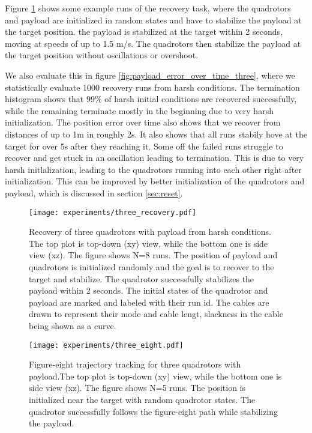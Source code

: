 Figure \ref{fig:three_recovery} shows some example runs of the recovery task, where the quadrotors and payload are initialized in random states and have to stabilize the payload at the target position. the payload is stabilized at the target within 2 seconds, moving at speeds of up to 1.5 m/s. The quadrotors then stabilize the payload at the target position without oscillations or overshoot.

We also evaluate this in figure \ref{fig:payload_error_over_time_three}, where we statistically evaluate 1000 recovery runs from harsh conditions. The termination histogram shows that 99\% of harsh initial conditions are recovered successfully, while the remaining terminate mostly in the beginning due to very harsh initialization. The position error over time also shows that we recover from distances of up to 1m in roughly 2s. It also shows that all runs stabily hove at the target for over 5s after they reaching it. Some off the failed runs struggle to recover and get stuck in an oscillation leading to termination. This is due to very harsh initlalization, leading to the quadrotors running into each other right after initialization. This can be improved by better initialization of the quadrotors and payload, which is discussed in section \ref{sec:reset}.

\begin{figure}[ht]
    \centering
    
    \texttt{[image: experiments/three\_recovery.pdf]}
    \caption{Recovery of three quadrotors with payload from harsh conditions. The top plot is top-down  (xy) view, while the bottom one is side view (xz).
    The figure shows N=8 runs. The position of payload and quadrotors is initialized randomly and the goal is to recover to the target and stabilize. The quadrotor successfully stabilizes the payload within 2 seconds. The initial states of the quadrotor and payload are marked and labeled with their run id. The cables are drawn to represent their mode and cable lengt, slackness in the cable being shown as a curve.}
    \label{fig:three_recovery}
\end{figure}
\begin{figure}[ht]
    \centering
    
    \texttt{[image: experiments/three\_eight.pdf]}
    \caption{Figure-eight trajectory tracking for three quadrotors with payload.The top plot is top-down  (xy) view, while the bottom one is side view (xz). The figure shows N=5 runs. The position is initialized near the target with random quadrotor states. The quadrotor successfully follows the figure-eight path while stabilizing the payload.}
    \label{fig:three_eight}
\end{figure}

